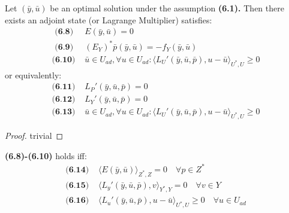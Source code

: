 \begin{corollary}
	Let $(\bar{y}, \bar{u})$ be an optimal solution under the assumption \textbf{(6.1).} Then there exists an adjoint state (or Lagrange Multiplier) satisfies:
	\begin{align*}
	\textbf{ (6.8) }	&E(\bar{y}, \bar{u}) = 0 \\
	\textbf{ (6.9) }	&(E_Y)^* \bar{p}(\bar{y}, \bar{u}) = -f_Y(\bar{y}, \bar{u})\\
	\textbf{(6.10) }	&\bar{u} \in U_{ad}, \forall u \in U_{ad}: 
		\langle L_U'(\bar{y}, \bar{u}, \bar{p})   , u - \bar{u} \rangle_{U^*, U} \ge 0
	\end{align*}
	or equivalently:
	\begin{align*}
		\textbf{(6.11) }
		&L_P'(\bar{y}, \bar{u}, \bar{p}) = 0\\
		\textbf{(6.12) }
		&L_Y'(\bar{y}, \bar{u}, \bar{p}) = 0\\
		\textbf{(6.13) }
		&\bar{u} \in U_{ad}, \forall u \in U_{ad}: 
		\langle L_U'(\bar{y}, \bar{u}, \bar{p})   , u - \bar{u} \rangle_{U^*, U} \ge 0
	\end{align*}
\end{corollary}
\begin{proof}
	trivial
\end{proof}
\begin{remark}
\textbf{(6.8)-(6.10)} holds iff:
\begin{align*}
	\textbf{(6.14) }&
	\langle E(\bar{y}, \bar{u}) \rangle_{Z^*, Z} = 0 \quad \forall p \in Z^*\\
	\textbf{(6.15) }&
	\langle L_y'(\bar{y}, \bar{u}, \bar{p}), v \rangle_{Y^*, Y} = 0 \quad \forall v \in Y\\
	\textbf{(6.16) }&
	\langle L_u'(\bar{y}, \bar{u}, \bar{p}), u - \bar{u} \rangle_{U^*, U} \ge 0 \quad \forall u \in U_{ad}
\end{align*}	
\end{remark}

